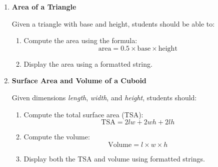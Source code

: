 \documentclass[a4paper,11pt]{article}
\theoremstyle{mytheor}
\begin{document}
\begin{enumerate}
    \item \textbf{Area of a Triangle}  
    
    Given a triangle with base and height, students should be able to:
    \begin{enumerate}
        \item Compute the area using the formula:
        \[
            \text{area} = 0.5 \times \text{base} \times \text{height}
        \]
        \item Display the area using a formatted string.
    \end{enumerate}
    


    
    \item \textbf{Surface Area and Volume of a Cuboid}
    
    Given dimensions \emph{length}, \emph{width}, and \emph{height}, students should:
    \begin{enumerate} 
        \item Compute the total surface area (TSA):
        \[
            \text{TSA} = 2lw + 2wh + 2lh
        \]
        \item Compute the volume:
        \[
            \text{Volume} = l \times w \times h
        \]
        \item Display both the TSA and volume using formatted strings.
    \end{enumerate}
    



\end{enumerate}
\end{document}
